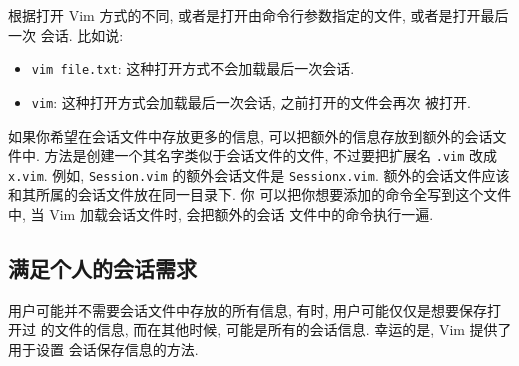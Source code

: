 根据打开 Vim 方式的不同, 或者是打开由命令行参数指定的文件, 或者是打开最后一次
会话. 比如说:
\begin{itemize}
    \item \texttt{vim file.txt}: 这种打开方式不会加载最后一次会话.
    \item \texttt{vim}: 这种打开方式会加载最后一次会话, 之前打开的文件会再次
        被打开.
\end{itemize}

如果你希望在会话文件中存放更多的信息, 可以把额外的信息存放到额外的会话文件中.
方法是创建一个其名字类似于会话文件的文件, 不过要把扩展名 \texttt{.vim} 改成
\texttt{x.vim}. 例如, \texttt{Session.vim} 的额外会话文件是
\texttt{Sessionx.vim}. 额外的会话文件应该和其所属的会话文件放在同一目录下. 你
可以把你想要添加的命令全写到这个文件中, 当 Vim 加载会话文件时, 会把额外的会话
文件中的命令执行一遍.

\subsection{满足个人的会话需求}
\label{subsec:satify_you_own_session_needs}

用户可能并不需要会话文件中存放的所有信息, 有时, 用户可能仅仅是想要保存打开过
的文件的信息, 而在其他时候, 可能是所有的会话信息. 幸运的是, Vim 提供了用于设置
会话保存信息的方法.

